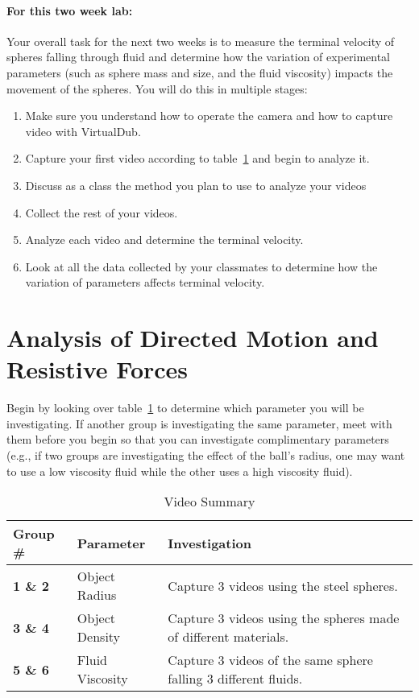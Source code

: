 \paragraph{For this two week lab:} Your overall task for the next two weeks is to measure the terminal velocity of spheres falling through fluid and determine how the variation of experimental parameters (such as sphere mass and size, and the fluid viscosity) impacts the movement of the spheres.
You will do this in multiple stages:
\begin{enumerate}
\itemsep-0.2em
\item Make sure you understand how to operate the camera and how to capture video with VirtualDub.
\item Capture your first video according to table~\ref{tab:exp2video} and begin to analyze it.
\item Discuss as a class the method you plan to use to analyze your videos
\item Collect the rest of your videos.
\item Analyze each video and determine the terminal velocity.
\item Look at all the data collected by your classmates to determine how the variation of parameters affects terminal velocity.
\end{enumerate}

\section{Analysis of Directed Motion and Resistive Forces}
Begin by looking over table~\ref{tab:exp2video} to determine which parameter you will be investigating.
If another group is investigating the same parameter, meet with them before you begin so that you can investigate complimentary parameters (e.g., if two groups are investigating the effect of the ball's radius, one may want to use a low viscosity fluid while the other uses a high viscosity fluid).

\begin{table}[ht]
\centering
\begin{tabular}{|l|l|p{10cm}|}
\hline
 \textbf{Group \#} & \textbf{Parameter} & \textbf{Investigation} \\ \hline
 \textbf{1 \& 2} & Object Radius & Capture 3 videos using the steel spheres. \\ \hline
 \textbf{3 \& 4} & Object Density & Capture 3 videos using the spheres made of different materials. \\ \hline
 \textbf{5 \& 6} & Fluid Viscosity & Capture 3 videos of the same sphere falling 3 different fluids. \\ \hline
\end{tabular}
\caption{Video Summary}
\label{tab:exp2video}
\end{table}

